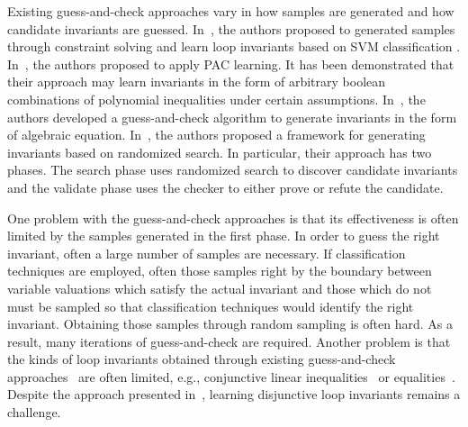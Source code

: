 Existing guess-and-check approaches vary in how samples are generated and how candidate invariants are guessed. In~\cite{sharma2012interpolants}, the authors proposed to generated samples through constraint solving and learn loop invariants based on SVM classification . In~\cite{sharma2013verification}, the authors proposed to apply PAC learning. It has been demonstrated that their approach may learn invariants in the form of arbitrary boolean
combinations of polynomial inequalities under certain assumptions. In~\cite{DBLP:conf/esop/0001GHALN13},
the authors developed a guess-and-check algorithm to generate invariants in the form of algebraic equation.
In~\cite{sharma2014invariant}, the authors proposed a framework for generating invariants based on randomized search.
In particular, their approach has two phases. The search phase uses randomized search to discover candidate invariants and the validate phase uses the checker to either prove or refute the candidate.

One problem with the guess-and-check approaches is that its effectiveness is often limited by the samples generated in the first phase. In order to guess the right invariant, often a large number of samples are necessary.
If classification techniques are employed, often those samples right by the boundary between variable valuations which satisfy the actual invariant and those which do not must be sampled so that classification techniques would identify the right invariant. Obtaining those samples through random sampling is often hard. As a result, many iterations of guess-and-check are required. Another problem is that the kinds of loop invariants obtained through existing guess-and-check approaches~\cite{sharma2012interpolants,sharma2013verification,DBLP:conf/esop/0001GHALN13,sharma2014invariant} are often limited, e.g., conjunctive linear inequalities~\cite{sharma2012interpolants} or equalities~\cite{DBLP:conf/esop/0001GHALN13}. Despite the approach presented in~\cite{DBLP:conf/pldi/GulwaniSV08,DBLP:conf/cav/SharmaDDA11}, learning disjunctive loop invariants remains a challenge.

